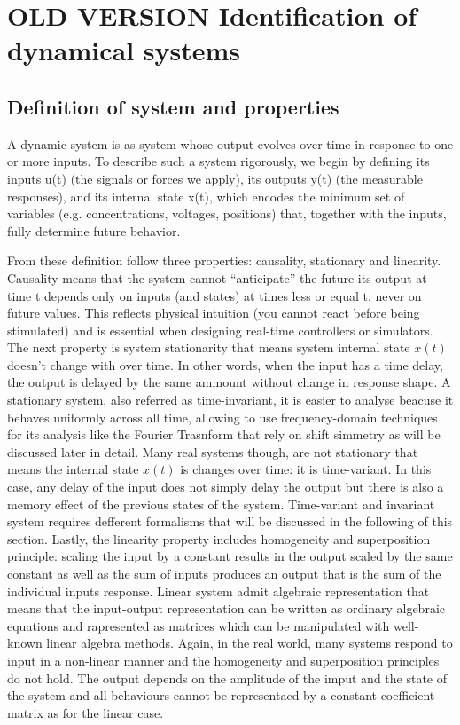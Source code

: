 \chapter{OLD VERSION Identification of dynamical systems}

\section{Definition of system and properties}
A dynamic system is as system whose output evolves over time in response to one or more inputs.  To describe such a system rigorously, we begin by defining its inputs u(t) (the signals or forces we apply), its outputs y(t) (the measurable responses), and its internal state x(t), which encodes the minimum set of variables (e.g. concentrations, voltages, positions) that, together with the inputs, fully determine future behavior. 

From these definition follow three properties: causality, stationary and linearity. Causality means that the system cannot “anticipate” the future its output at time t depends only on inputs (and states) at times less or equal t, never on future values.  This reflects physical intuition (you cannot react before being stimulated) and is essential when designing real-time controllers or simulators. The next property is system stationarity that means system internal state $x(t)$ doesn't change with over time. In other words, when the input has a time delay, the output is delayed by the same ammount without change in response shape. A stationary system, also referred as time-invariant, it is easier to analyse beacuse it behaves uniformly across all time, allowing to use frequency-domain techniques for its analysis like the Fourier Trasnform that rely on shift simmetry as will be discussed later in detail. Many real systems though, are not stationary that means the internal state $x(t)$ is changes over time: it is time-variant. In this case, any delay of the input does not simply delay the output but there is also a memory effect of the previous states of the system. Time-variant and invariant system requires defferent formalisms that will be discussed in the following of this section. Lastly, the linearity property includes homogeneity and superposition principle: scaling the input by a constant results in the output scaled by the same constant as well as the sum of inputs produces an output that is the sum of the individual inputs response. Linear system admit algebraic representation that means that the input-output representation can be written as ordinary algebraic equations and rapresented as matrices which can be manipulated with well-known linear algebra methods. Again, in the real world, many systems respond to input in a non-linear manner and the homogeneity and superposition principles do not hold. The output depends on the amplitude of the imput and the state of the system and all behaviours cannot be representaed by a constant-coefficient matrix as for the linear case.

